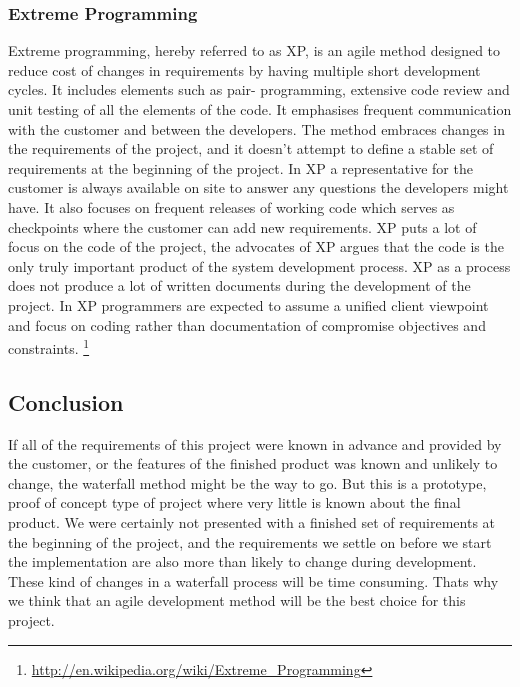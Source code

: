 \subsubsection{Extreme Programming}
Extreme programming, hereby referred to as XP, is an agile method designed to reduce cost of changes in requirements by having multiple short development cycles. It includes elements such as pair- programming, extensive code review and unit testing of all the elements of the code. It emphasises frequent communication with the customer and between the developers. The method embraces changes in the requirements of the project, and it doesn't attempt to define a stable set of requirements at the beginning of the project. In XP a representative for the customer is always available on site to answer any questions the developers might have. It also focuses on frequent releases of working code which serves as checkpoints where the customer can add new requirements. XP puts a lot of focus on the code of the project, the advocates of XP argues that the code is the only truly important product of the system development process. XP as a process does not produce a lot of written documents during the development of the project. In XP programmers are expected to assume a unified client viewpoint and focus on coding rather than documentation of compromise objectives and constraints.
\footnote{\url{http://en.wikipedia.org/wiki/Extreme_Programming}}

\subsection{Conclusion}
If all of the requirements of this project were known in advance and provided by the customer, or the features of the finished product was known and unlikely to change, the waterfall method might be the way to go. But this is a prototype, proof of concept type of project where very little is known about the final product. We were certainly not presented with a finished set of requirements at the beginning of the project, and the requirements we settle on before we start the implementation are also more than likely to change during development. These kind of changes in a waterfall process will be time consuming. Thats why we think that an agile development method will be the best choice for this project.

